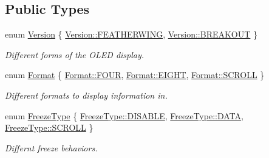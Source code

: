 \subsection*{Public Types}
\begin{DoxyCompactItemize}
\item 
enum \hyperlink{class_loom___o_l_e_d_aaf40c7e29901e7130f86046a26cb7400}{Version} \{ \hyperlink{class_loom___o_l_e_d_aaf40c7e29901e7130f86046a26cb7400a012f86b3ded09f31189cefd9fe361d97}{Version\+::\+F\+E\+A\+T\+H\+E\+R\+W\+I\+NG}, 
\hyperlink{class_loom___o_l_e_d_aaf40c7e29901e7130f86046a26cb7400aef55538fb1b52e6052c75869be750acc}{Version\+::\+B\+R\+E\+A\+K\+O\+UT}
 \}\begin{DoxyCompactList}\small\item\em Different forms of the O\+L\+ED display. \end{DoxyCompactList}
\item 
enum \hyperlink{class_loom___o_l_e_d_aade282dab7eb118271f73b3b3bfc0ffd}{Format} \{ \hyperlink{class_loom___o_l_e_d_aade282dab7eb118271f73b3b3bfc0ffda341fee9692a2ed8f09906d40d23fb1f9}{Format\+::\+F\+O\+UR}, 
\hyperlink{class_loom___o_l_e_d_aade282dab7eb118271f73b3b3bfc0ffda960df6d77e65cd185ca4f3501db634eb}{Format\+::\+E\+I\+G\+HT}, 
\hyperlink{class_loom___o_l_e_d_aade282dab7eb118271f73b3b3bfc0ffda71574275cadb387a5082e87e9dd60c25}{Format\+::\+S\+C\+R\+O\+LL}
 \}\begin{DoxyCompactList}\small\item\em Different formats to display information in. \end{DoxyCompactList}
\item 
enum \hyperlink{class_loom___o_l_e_d_adedc20c1c901fe472d976c722abf0bb9}{Freeze\+Type} \{ \hyperlink{class_loom___o_l_e_d_adedc20c1c901fe472d976c722abf0bb9afc93ea58f6d27ffed2b6518ffecf3e4e}{Freeze\+Type\+::\+D\+I\+S\+A\+B\+LE}, 
\hyperlink{class_loom___o_l_e_d_adedc20c1c901fe472d976c722abf0bb9ae44f9e348e41cb272efa87387728571b}{Freeze\+Type\+::\+D\+A\+TA}, 
\hyperlink{class_loom___o_l_e_d_adedc20c1c901fe472d976c722abf0bb9a71574275cadb387a5082e87e9dd60c25}{Freeze\+Type\+::\+S\+C\+R\+O\+LL}
 \}\begin{DoxyCompactList}\small\item\em Differnt freeze behaviors. \end{DoxyCompactList}
\end{DoxyCompactItemize}
